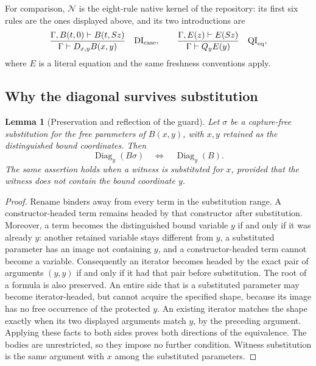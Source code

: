 \documentclass[11pt]{article}
\newtheorem{lemma}[theorem]{Lemma}
\theoremstyle{definition}
\theoremstyle{remark}
\begin{document}
For comparison, $\mathcal N$ is the eight-rule native kernel of the
repository: its first six rules are the ones displayed above, and its two
introductions are
\begin{equation}
 \frac{\Gamma,B(t,0)\vdash B(t,Sz)}
      {\Gamma\vdash D_{x,y}B(x,y)}
 \quad\text{DI}_{\rm case},
 \qquad
 \frac{\Gamma,E(z)\vdash E(Sz)}
      {\Gamma\vdash Q_y E(y)}
 \quad\text{QI}_{\rm eq},
 \label{eq:diag-native-intros}
\end{equation}
where $E$ is a literal equation and the same freshness conventions apply.

\subsection{Why the diagonal survives substitution}

\begin{lemma}[Preservation and reflection of the guard]
\label{lem:diag-stable}
Let $\sigma$ be a capture-free substitution for the free parameters of
$B(x,y)$, with $x,y$ retained as the distinguished bound coordinates.
Then
\[
 \operatorname{Diag}_y(B\sigma)
 \quad\Longleftrightarrow\quad
 \operatorname{Diag}_y(B).
\]
The same assertion holds when a witness is substituted for $x$, provided
that the witness does not contain the bound coordinate $y$.
\end{lemma}
\begin{proof}
Rename binders away from every term in the substitution range.
A constructor-headed term remains headed by that constructor after
substitution.  Moreover, a term becomes the distinguished bound variable
$y$ if and only if it was already $y$: another retained variable stays
different from $y$, a substituted parameter has an image not containing
$y$, and a constructor-headed term cannot become a variable.
Consequently an iterator becomes headed by the exact pair of arguments
$(y,y)$ if and only if it had that pair before substitution.
The root of a formula is also preserved.  An entire side that is a
substituted parameter may become iterator-headed, but cannot acquire the
specified shape, because its image has no free occurrence of the protected
$y$.  An existing iterator matches the shape exactly when its two displayed
arguments match $y$, by the preceding argument.  Applying these facts to
both sides proves both directions of the equivalence.  The bodies are
unrestricted, so they impose no further condition.  Witness substitution
is the same argument with $x$ among the substituted parameters.
\end{proof}
\end{document}
